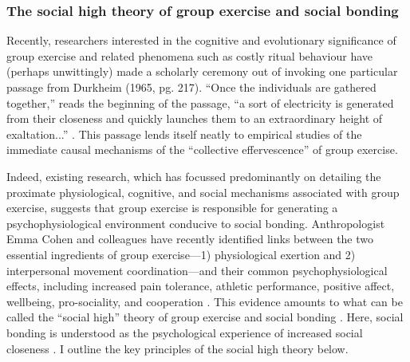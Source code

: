 \begin{CJK}{UTF8}{gbsn}
\subsubsection{The social high theory of group exercise and social bonding \label{sect:socialHigh}}
Recently, researchers interested in the cognitive and evolutionary significance of group exercise and related phenomena such as costly ritual behaviour have (perhaps unwittingly) made a scholarly ceremony out of invoking one particular passage from Durkheim (1965, pg. 217).  ``Once the individuals are gathered together,'' reads the beginning of the passage, ``a sort of electricity is generated from their closeness and quickly launches them to an extraordinary height of exaltation...'' \citep[see ][]{McNeill1995,Konvalinka2011,Fischer2014,Mogan2017}. This passage lends itself neatly to empirical studies of the immediate causal mechanisms of the ``collective effervescence'' of group exercise.

Indeed, existing research, which has focussed predominantly on detailing the proximate physiological, cognitive, and social mechanisms associated with group exercise, suggests that group exercise is responsible for generating a psychophysiological environment conducive to social bonding.  Anthropologist Emma Cohen and colleagues have recently identified links between the two essential ingredients of group exercise---1) physiological exertion and 2) interpersonal movement coordination---and their common psychophysiological effects, including increased pain tolerance, athletic performance, positive affect, wellbeing, pro-sociality, and cooperation \citep{Davis2015}. This evidence amounts to what can be called the ``social high'' theory of group exercise and social bonding \citep[hereafter ``the social high theory,'' see][]{Cohen2017}. Here, social bonding is understood as the psychological experience of increased social closeness \citep{Tarr2014}.  I outline the key principles of the social high theory below.


\end{CJK}
